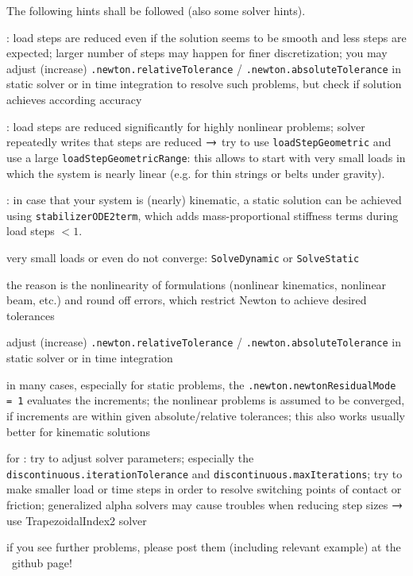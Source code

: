 \noindent The following hints shall be followed (also some solver hints).
\bi
  \item {}: load steps are reduced even if the solution seems to be smooth and less steps are expected; larger number of steps may happen for finer discretization; you may adjust (increase) \texttt{.newton.relativeTolerance} / \texttt{.newton.absoluteTolerance} in static solver or in time integration to resolve such problems, but check if solution achieves according accuracy
  \item {}: load steps are reduced significantly for highly nonlinear problems; solver repeatedly writes that steps are reduced $\ra$ try to use \texttt{loadStepGeometric} and use a large \texttt{loadStepGeometricRange}: this allows to start with very small loads in which the system is nearly linear (e.g. for thin strings or belts under gravity).
  \item {}: in case that your system is (nearly) kinematic, a static solution can be achieved using \texttt{stabilizerODE2term}, which adds mass-proportional stiffness terms during load steps $< 1$.
  \item very small loads or even  do not converge: \texttt{SolveDynamic} or \texttt{SolveStatic} 
  \bi
  \item[$\ra$] the reason is the nonlinearity of formulations (nonlinear kinematics, nonlinear beam, etc.) and round off errors, which restrict Newton to achieve desired tolerances
  \item[$\ra$] adjust (increase) \texttt{.newton.relativeTolerance} / \texttt{.newton.absoluteTolerance} in static solver or in time integration
  \item[$\ra$] in many cases, especially for static problems, the \texttt{.newton.newtonResidualMode = 1} evaluates the increments; the nonlinear problems is assumed to be converged, if increments are within given absolute/relative tolerances; this also works usually better for kinematic solutions
  \ei
  \item for : try to adjust solver parameters; especially the \texttt{discontinuous.iterationTolerance} and \texttt{discontinuous.maxIterations}; try to make smaller load or time steps in order to resolve switching points of contact or friction; generalized alpha solvers may cause troubles when reducing step sizes $\ra$ use TrapezoidalIndex2 solver
  \item if you see further problems, please post them (including relevant example) at the \codeName\ github page!
\ei


